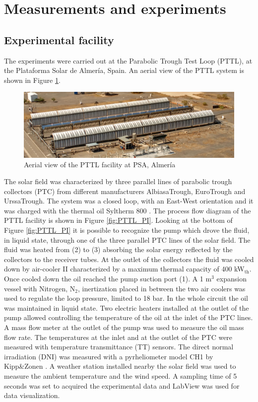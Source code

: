 \documentclass[final,3p,times,review]{elsarticle}
\begin{document}
%
%
\section{Measurements and experiments} \label{Sec:Measurements}
\subsection{Experimental facility}
%
The experiments were carried out at the Parabolic Trough Test Loop (PTTL), at the Plataforma Solar de Almer\' ia, Spain. An aerial view of the PTTL system is shown in Figure \ref{fig:PTTL_photo}.
%
\begin{figure}[h!]
\centering
\includegraphics[width=1\textwidth]{Figures/SolarFieldTestRig_II.PNG}
\caption{Aerial view of the PTTL facility at PSA, Almer\' ia}
\label{fig:PTTL_photo}
\end{figure}
%
The solar field was characterized by three parallel lines of parabolic trough collectors (PTC) from different manufacturers AlbiasaTrough, EuroTrough and UrssaTrough. The system was a closed loop, with an East-West orientation and it was charged with the thermal oil Syltherm 800 \cite{DowOilandGas1997}. The process flow diagram of the PTTL facility is shown in Figure \ref{fig:PTTL_PI}. Looking at the bottom of Figure \ref{fig:PTTL_PI} it is possible to recognize the pump which drove the fluid, in liquid state, through one of the three parallel PTC lines of the solar field. The fluid was heated from (2) to (3) absorbing the solar energy reflected by the collectors to the receiver tubes. At the outlet of the collectors the fluid was cooled down by air-cooler II characterized by a maximum thermal capacity of 400 kW$_\mathrm{th}$. Once cooled down the oil reached the pump suction port (1). A 1 m$^3$ expansion vessel with Nitrogen, N$_\mathrm{2}$, inertization placed in between the two air coolers was used to regulate the loop pressure, limited to 18 bar. In the whole circuit the oil was maintained in liquid state. Two electric heaters installed at the outlet of the pump allowed controlling the temperature of the oil at the inlet of the PTC lines. A mass flow meter at the outlet of the pump was used to measure the oil mass flow rate. The temperatures at the inlet and at the outlet of the PTC were measured with temperature transmittance (TT) sensors. The direct normal irradiation (DNI) was measured with a pyrheliometer model CH1 by Kipp\&Zonen \cite{Kipp1997}. A weather station installed nearby the solar field was used to measure the ambient temperature and the wind speed. A sampling time of 5 seconds was set to acquired the experimental data and LabView was used for data visualization. 
\end{document}
